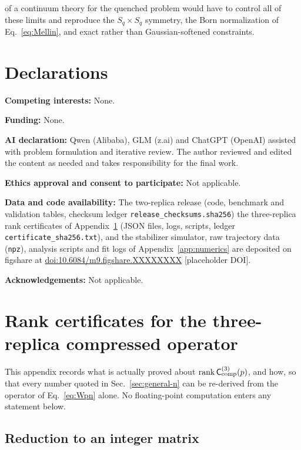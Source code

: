 \documentclass[aps,prx,reprint,superscriptaddress,nobibnotes,longbibliography]{revtex4-2}
\theoremstyle{remark}
\newcommand{\rk}{\operatorname{rank}}
\newcommand{\Ccomp}{\mathsf C_{\rm comp}}
\begin{document}
of a continuum theory for the quenched problem would have to control all of these limits and reproduce the $S_q\times S_q$ symmetry, the Born normalization of Eq.~\eqref{eq:Mellin}, and exact rather than Gaussian-softened constraints.


\section*{Declarations}

\noindent\textbf{Competing interests:} None.

\noindent\textbf{Funding:} None.

\noindent\textbf{AI declaration:} Qwen (Alibaba), GLM (z.ai) and ChatGPT (OpenAI) assisted with problem formulation and iterative review.  The author reviewed and edited the content as needed and takes responsibility for the final work.

\noindent\textbf{Ethics approval and consent to participate:} Not applicable.

\noindent\textbf{Data and code availability:} The two-replica release (code, benchmark and validation tables, checksum ledger \texttt{release\_checksums.sha256}) the three-replica rank certificates of Appendix~\ref{app:rank3} (JSON files, logs, scripts, ledger \texttt{certificate\_sha256.txt}), and the stabilizer simulator, raw trajectory data (\texttt{npz}), analysis scripts and fit logs of Appendix~\ref{app:numerics} are deposited on figshare at \href{https://doi.org/10.6084/m9.figshare.XXXXXXXX}{doi:10.6084/m9.figshare.XXXXXXXX} [placeholder DOI].

\noindent\textbf{Acknowledgements:} Not applicable.

\appendix
\section{Rank certificates for the three-replica compressed operator}
\label{app:rank3}

This appendix records what is actually proved about $\rk\Ccomp^{(3)}(p)$, and how, so that every number quoted in Sec.~\ref{sec:general-n} can be re-derived from the operator of Eq.~\eqref{eq:Wpn} alone.  No floating-point computation enters any statement below.

\subsection{Reduction to an integer matrix}
\label{app:reduction}
\end{document}
